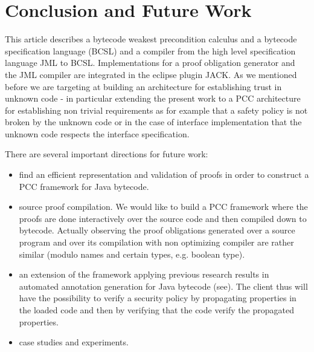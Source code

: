 \section{Conclusion and Future Work}\label{conclusion}
This article describes a bytecode weakest precondition calculus and a bytecode specification language (BCSL) and a compiler from the high level specification language JML to BCSL. Implementations for a proof obligation generator and the JML compiler are integrated in the eclipse plugin JACK. As we mentioned before we are targeting at building an architecture for establishing trust in unknown code - in particular extending the present work to a PCC architecture for establishing non trivial requirements as for example that a 
safety policy is not broken by the unknown code or in the case of interface implementation that the unknown code respects the interface specification.  


There are several important directions for future work:
\begin{itemize}
\item find an efficient representation and validation of proofs in order to construct a PCC framework for Java bytecode. 
\item source proof compilation. We would like to build a PCC framework where the proofs are done interactively over the source code
and then compiled down to bytecode. Actually observing the proof obligations generated over a source program and over its compilation with non optimizing compiler are
rather similar (modulo names and certain types, e.g. boolean type).
\item an extension of the framework applying previous research results in automated annotation generation for Java bytecode (see\cite{PBBHL}). The client thus will have the possibility to verify a security policy by propagating properties in the loaded code and then by verifying that the code verify the propagated properties.

\item case studies and experiments.
\end{itemize}


